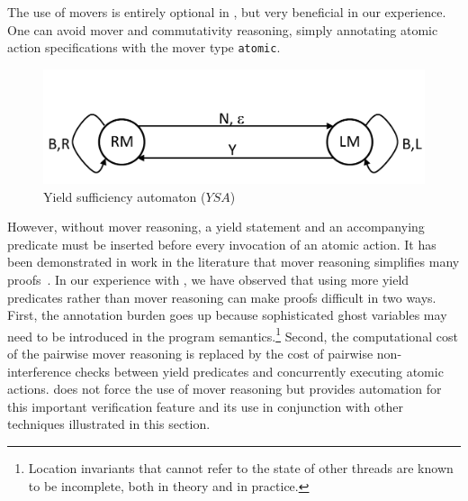 The use of movers is entirely optional in \civl, but very beneficial
in our experience. One can avoid 
mover and commutativity reasoning, simply
annotating atomic action specifications with the mover type {\tt atomic}.
\begin{figure}
\vspace*{-1cm}
\begin{center}
\includegraphics[scale=0.25]{YieldTypeCheckingAutomaton.pdf}
\end{center} 
\vspace*{-0.3cm}
\caption{Yield sufficiency automaton ($YSA$)}
\label{fig:ysa}
\end{figure}
However, without mover reasoning,  a yield statement and an
accompanying predicate
must be inserted before every invocation of an atomic action.
It has been demonstrated in work in the literature that mover
reasoning simplifies many proofs~\cite{ElmasQT09}. 
In our experience with \civl, we have observed that using more yield
predicates rather than mover reasoning can make proofs difficult in two ways.
First, the annotation burden goes up because sophisticated ghost variables may need to be introduced in the 
program semantics.\footnote{Location invariants that cannot refer to the state of other threads are known to be incomplete, 
both in theory and in practice.}
Second, the computational cost of the pairwise mover reasoning is replaced by the cost of pairwise non-interference checks between yield predicates 
and concurrently executing atomic actions. 
\civl does not force the use of mover
reasoning but provides automation for this important verification
feature and its use in conjunction with other techniques illustrated in
this section. 


